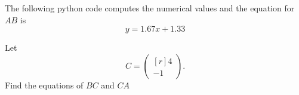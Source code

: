\documentclass[journal,12pt,twocolumn]{IEEEtran}
\begin{document}
The following python code computes the numerical values and the equation for $AB$ is
\begin{equation}
y =1.67x +1.33
\end{equation}

\begin{problem}
Let 
\begin{equation}
C =
\begin{pmatrix*}[r]
4
\\
-1
\end{pmatrix*}.
\end{equation}
%
Find the equations of $BC$ and $CA$
\end{problem}
%
%
\end{document}
